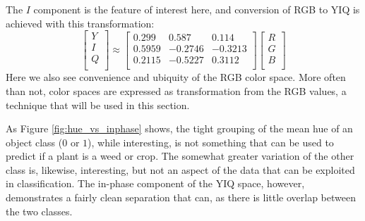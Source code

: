 \documentclass[letterpaper]{report}
\begin{document}
The $I$ component is the feature of interest here, and conversion of RGB to YIQ is achieved with this transformation:
\begin{equation}
	\begin{bmatrix}
	Y \\[0.3em]
	I \\[0.3em]
	Q \\[0.3em]
	\end{bmatrix}
	\approx
	\begin{bmatrix}
	0.299 & 0.587 & 0.114 \\[0.3em]
	0.5959 & -0.2746 & -0.3213\\[0.3em]
	0.2115 & -0.5227 & 0.3112 \\[0.3em]
	\end{bmatrix}
	\begin{bmatrix}
	R \\[0.3em]
	G \\[0.3em]
	B \\[0.3em]
	\end{bmatrix}	
\end{equation}
Here we also see convenience and ubiquity of the RGB color space. More often than not, color spaces are expressed as transformation from the RGB values, a technique that will be used in this section.

As Figure \ref{fig:hue_vs_inphase} shows, the tight grouping of the mean hue of an object class ($0$ or $1$), while interesting, is not something that can be used to predict if a plant is a weed or crop.  The somewhat greater variation of the other class is, likewise, interesting, but not an aspect of the data that can be exploited in classification. The in-phase component of the YIQ space, however, demonstrates a fairly clean separation that can, as there is little overlap between the two classes.
\end{document}
